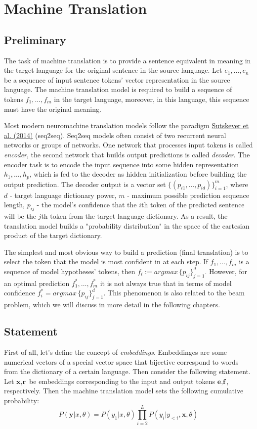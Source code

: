 \documentclass[a4paper,14pt]{extarticle}
\newcommand{\bibref}[3]{\hyperlink{#1}{#2 (#3)}}
\begin{document}
	\section{Machine Translation}
	\subsection{Preliminary}
		The task of machine translation is to provide a sentence equivalent in meaning in the target language for the original sentence in the source language. Let $e_1, \dots, e_n$ be a sequence of input sentence tokens' vector representation in the source language. The machine translation model is required to build a sequence of tokens $f_1, \dots, f_m$ in the target language, moreover, in this language, this sequence must have the original meaning.
	
	Most modern neuromachine translation models follow the paradigm \bibref{seq2seq}{Sutskever et al.}{2014} (seq2seq). Seq2seq models often consist of two recurrent neural networks or groups of networks. One network that processes input tokens is called \textit{encoder}, the second network that builds output predictions is called \textit{decoder}. The encoder task is to encode the input sequence into some hidden representation $h_1, \dots, h_p$, which is fed to the decoder as hidden initialization before building the output prediction. The decoder output is a vector set $\{(p_{i1}, \dots, p_{id})\}_{i=1}^{m}$, where $d$ - target language dictionary power, $m$ - maximum possible prediction sequence length, $p_{ij}$ - the model's confidence that the $i$th token of the predicted sentence will be the $j$th token from the target language dictionary. As a result, the translation model builds a "probability distribution" in the space of the cartesian product of the target dictionary.

	The simplest and most obvious way to build a prediction (final translation) is to select the token that the model is most confident in at each step. If $f_1, \dots, f_m$ is a sequence of model hypotheses' tokens, then $f_i := argmax \, \{p_{ij}\}_{j=1}^{d}$. However, for an optimal prediction $f_1^*, \dots, f_m^*$ it is not always true that in terms of model confidence $f_i^* = argmax \, \{p_{ij}\}_{j=1}^{d}$. This phenomenon is also related to the beam problem, which we will discuss in more detail in the following chapters.
	\subsection{Statement}
	First of all, let's define the concept of \textit{embeddings}. Embeddinges are some numerical vectors of a special vector space that bijective correspond to words from the dictionary of a certain language. Then consider the following statement.
Let $\textbf{x}, \textbf{r}$ be embeddings corresponding to the input and output tokens $\textbf{e}, \textbf{f}$, respectively.
Then the machine translation model sets the following cumulative probability:
	\begin{equation}
		P(\textbf{y} | x, \theta) = P(y_1 | x, \theta) \prod_{i=2}^{L} P(y_i | y_{<i}, \textbf{x}, \theta)
	\end{equation}
	
\end{document}
